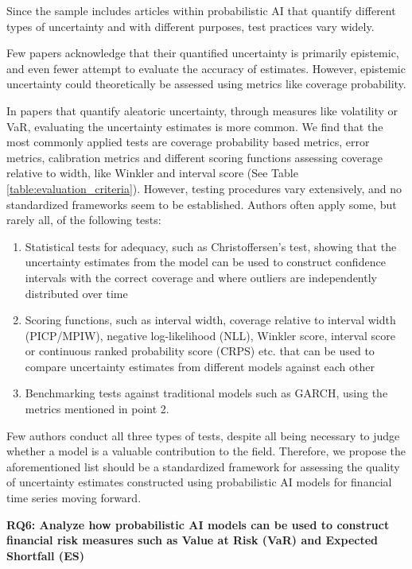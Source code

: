 Since the sample includes articles within probabilistic AI that quantify different types of uncertainty and with different purposes, test practices vary widely.

Few papers acknowledge that their quantified uncertainty is primarily epistemic, and even fewer attempt to evaluate the accuracy of estimates. However, epistemic uncertainty could theoretically be assessed using metrics like coverage probability.

In papers that quantify aleatoric uncertainty, through measures like volatility or VaR, evaluating the uncertainty estimates is more common. We find that the most commonly applied tests are coverage probability based metrics, error metrics, calibration metrics and different scoring functions assessing coverage relative to width, like Winkler and interval score (See Table \ref{table:evaluation_criteria}).  However, testing procedures vary extensively, and no standardized frameworks seem to be established. Authors often apply some, but rarely all, of the following tests:

\begin{enumerate}
    \item Statistical tests for adequacy, such as Christoffersen's test, showing that the uncertainty estimates from the model can be used to construct confidence intervals with the correct coverage and where outliers are independently distributed over time
    \item Scoring functions, such as interval width, coverage relative to interval width (PICP/MPIW), negative log-likelihood (NLL), Winkler score, interval score or continuous ranked probability score (CRPS) etc. that can be used to compare uncertainty estimates from different models against each other
    \item Benchmarking tests against traditional models such as GARCH, using the metrics mentioned in point 2.
\end{enumerate}

Few authors conduct all three types of tests, despite all being necessary to judge whether a model is a valuable contribution to the field. Therefore, we propose the aforementioned list should be a standardized framework for assessing the quality of uncertainty estimates constructed using probabilistic AI models for financial time series moving forward. 

\pagebreak
\textbf{RQ6: Analyze how probabilistic AI models can be used to construct financial risk measures such as Value at Risk (VaR) and Expected Shortfall (ES)}\nopagebreak


